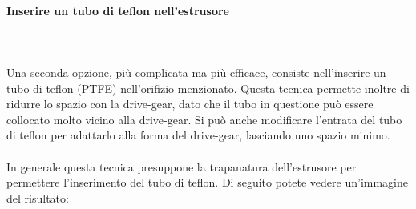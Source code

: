 \documentclass[11pt,a4paper]{article}
\begin{document}
			\paragraph{Inserire un tubo di teflon nell'estrusore}\mbox{}\\\\
Una seconda opzione, più complicata ma più efficace, consiste nell'inserire un tubo di teflon (PTFE) nell'orifizio menzionato. Questa tecnica permette inoltre di ridurre lo spazio con la drive-gear, dato che il tubo in questione può essere collocato molto vicino alla drive-gear. Si può anche modificare l'entrata del tubo di teflon per adattarlo alla forma del drive-gear, lasciando uno spazio minimo.
\\\\
In generale questa tecnica presuppone la trapanatura dell'estrusore per permettere l'inserimento del tubo di teflon. Di seguito potete vedere un'immagine del risultato:
\end{document}
